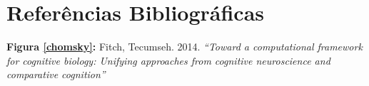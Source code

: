 \section{Referências Bibliográficas}

\textbf{Figura \ref{chomsky}:} Fitch, Tecumseh. 2014. \textit{``Toward a
computational framework for cognitive biology: Unifying approaches from
cognitive neuroscience and comparative cognition''}